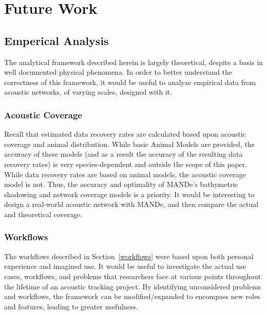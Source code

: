 \section{Future Work}
\subsection{Emperical Analysis}
The analytical framework described herein is largely theoretical, despite a basis in well documented physical phenomena.  In order to better understand the correctness of this framework, it would be useful to analyze empirical data from acoustic networks, of varying scales, designed with it.

\subsubsection{Acoustic Coverage}
Recall that estimated data recovery rates are calculated based upon acoustic coverage and animal distribution.  While basic Animal Models are provided, the accuracy of these models (and as a result the accuracy of the resulting data recovery rates) is very species-dependent and outside the scope of this paper.  While data recovery rates are based on animal models, the acoustic coverage model is not.  Thus, the accuracy and optimality of MANDe's bathymetric shadowing and network coverage models is a priority.  It would be interesting to design a real-world acoustic network with MANDe, and then compare the actual and theoretical coverage.

\subsubsection{Workflows}
The workflows described in Section~\ref{workflows} were based upon both personal experience and imagined use.  It would be useful to investigate the actual use cases, workflows, and problems that researchers face at various points throughout the lifetime of an acoustic tracking project.  By identifying unconsidered problems and workflows, the framework can be modified/expanded to encompass new roles and features, leading to greater usefulness.

